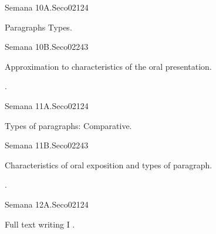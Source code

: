 \begin{syllabus}
\begin{unit}{Semana 10A.}{}{Seco02}{12}{4}
   \begin{topics}
      \item Paragraphs Types.
   \end{topics}
   \begin{learningoutcomes}
      \item 
   \end{learningoutcomes}
\end{unit}

\begin{unit}{Semana 10B.}{}{Seco02}{24}{3}
   \begin{topics}
      \item Approximation to characteristics of the oral presentation.
   \end{topics}

   \begin{learningoutcomes}
      \item .
      \end{learningoutcomes}
\end{unit}


\begin{unit}{Semana 11A.}{}{Seco02}{12}{4}
   \begin{topics}
      \item Types of paragraphs: Comparative.
   \end{topics}
   \begin{learningoutcomes}
      \item 
   \end{learningoutcomes}
\end{unit}

\begin{unit}{Semana 11B.}{}{Seco02}{24}{3}
   \begin{topics}
      \item Characteristics of oral exposition and types of paragraph.
   \end{topics}

   \begin{learningoutcomes}
      \item .
      \end{learningoutcomes}
\end{unit}


\begin{unit}{Semana 12A.}{}{Seco02}{12}{4}
   \begin{topics}
      \item Full text writing I .
   \end{topics}
   \begin{learningoutcomes}
      \item 
   \end{learningoutcomes}
\end{unit}


\end{syllabus}
